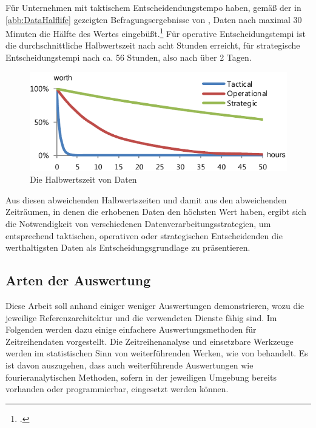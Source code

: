 


Für Unternehmen mit taktischem Entscheidendungstempo haben, gemäß der in \autoref{abb:DataHalflife} gezeigten Befragungsergebnisse von \citeauthor{NucleusResarchInc..2012}, Daten nach maximal 30 Minuten die Hälfte des Wertes eingebüßt.\footcite[Vgl. auch im Folgenden][6]{NucleusResarchInc..2012} Für operative Entscheidungstempi ist die durchschnittliche Halbwertszeit nach acht Stunden erreicht, für strategische Entscheidungstempi nach ca. 56 Stunden, also nach über 2 Tagen.



\begin{figure}[H]
\centering
\includegraphics[width=\textwidth]{graphics/half-life-data.pdf}
\caption[Die Halbwertszeit von Daten]{Die Halbwertszeit von Daten\footnotemark}
\label{abb:DataHalflife}
\end{figure}
Aus diesen abweichenden Halbwertszeiten und damit aus den abweichenden Zeiträumen, in denen die erhobenen Daten den höchsten Wert haben, ergibt sich die Notwendigkeit von verschiedenen Datenverarbeitungsstrategien, um entsprechend taktischen, operativen oder strategischen  Entscheidenden die werthaltigsten Daten als Entscheidungsgrundlage zu präsentieren.

\subsection{Arten der Auswertung}\label{chap:auswertungsarten}
Diese Arbeit soll anhand einiger weniger Auswertungen demonstrieren, wozu die jeweilige Referenzarchitektur und die verwendeten Dienste fähig sind. Im Folgenden werden dazu einige einfachere Auswertungsmethoden für Zeitreihendaten vorgestellt. Die Zeitreihenanalyse und einsetzbare Werkzeuge werden im statistischen Sinn von weiterführenden Werken, wie von \citeauthor{Shumway.2017} behandelt. Es ist davon auszugehen, dass auch weiterführende Auswertungen wie fourieranalytischen Methoden, sofern in der jeweiligen Umgebung bereits vorhanden oder programmierbar, eingesetzt werden können.


